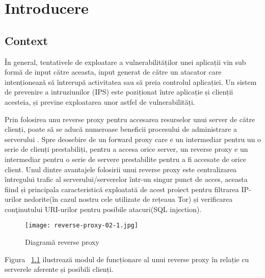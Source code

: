 
\chapter{Introducere}
\label{cap:Introducere}


\section{Context}

În general, tentativele de exploatare a vulnerabilităților unei aplicații vin sub formă de input către aceasta, input generat de către un atacator care intenționează să întrerupă activitatea sau să preia controlul aplicației. Un sistem de prevenire a intruziunilor (IPS) este poziționat între aplicație și clienții acesteia, și previne exploatarea unor astfel de vulnerabilități. 

Prin folosirea unu reverse proxy pentru accesarea resurselor unui server de către clienți, poate să se aducă numeroase beneficii procesului de administrare a serverului \cite{top_8}. Spre deosebire de un forward proxy care e un intermediar pentru un o serie de clienți prestabiliți, pentru a accesa orice server, un reverse proxy e un intermediar pentru o serie de servere prestabilite pentru a fi accesate de orice client. Unul dintre avantajele folosirii unui reverse proxy este centralizarea întregului trafic al serverului/serverelor într-un singur punct de acces, aceasta fiind și principala caracteristică exploatată de acest proiect pentru filtrarea IP-urilor nedorite(în cazul nostru cele utilizate de rețeaua Tor) și verificarea conţinutului URI-urilor pentru posibile atacuri(SQL injection).

\begin{figure}[h]
	\centering
	\texttt{[image: reverse-proxy-02-1.jpg]}
	\caption{ Diagramă reverse proxy }
	\label{fig:reverse-proxy}
\end{figure}

Figura ~\ref{fig:reverse-proxy}  ilustrează modul de funcționare al unui reverse proxy în relație cu serverele aferente și posibili clienți.  \\

 

